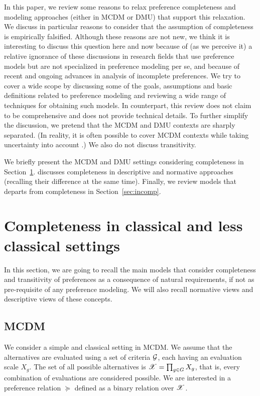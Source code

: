 \documentclass[french, english]{llncs}
\begin{document}
In this paper, we review some reasons to relax preference completeness and modeling approaches (either in MCDM or DMU) that support this relaxation. We discuss in particular reasons to consider that the assumption of completeness is empirically falsified. Although these reasons are not new, we think it is interesting to discuss this question here and now because of (as we perceive it) a relative ignorance of these discussions in research fields that use preference models but are not specialized in preference modeling per se, and because of recent and ongoing advances in analysis of incomplete preferences.
We try to cover a wide scope by discussing some of the goals, assumptions and basic definitions related to preference modeling and reviewing a wide range of techniques for obtaining such models. In counterpart, this review does not claim to be comprehensive and does not provide technical details. To further simplify the discussion, we pretend that the MCDM and DMU contexts are sharply separated. (In reality, it is often possible to cover MCDM contexts while taking uncertainty into account \citep{keeney_decisions_1993}.) We also do not discuss transitivity.

We briefly present the MCDM and DMU settings considering completeness in Section~\ref{sec:review}.  discusses completeness in descriptive and normative approaches (recalling their difference at the same time). Finally, we review models that departs from completeness in Section~\ref{sec:incomp}.
	
\section{Completeness in classical and less classical settings}\label{sec:review}
In this section, we are going to recall the main models that consider completeness and transitivity of preferences as a consequence of natural requirements, if not as pre-requisite of any preference modeling. We will also recall normative views and descriptive views of these concepts. 
	
\subsection{MCDM}
We consider a simple and classical setting in MCDM. We assume that the alternatives are evaluated using a set of criteria $\mathcal{G}$, each having an evaluation scale $X_g$. The set of all possible alternatives is $\mathscr{X} = \prod_{g \in G} X_g$, that is, every combination of evaluations are considered possible. 
We are interested in a preference relation $\succeq$ defined as a binary relation over $\mathscr{X}$.
\end{document}
